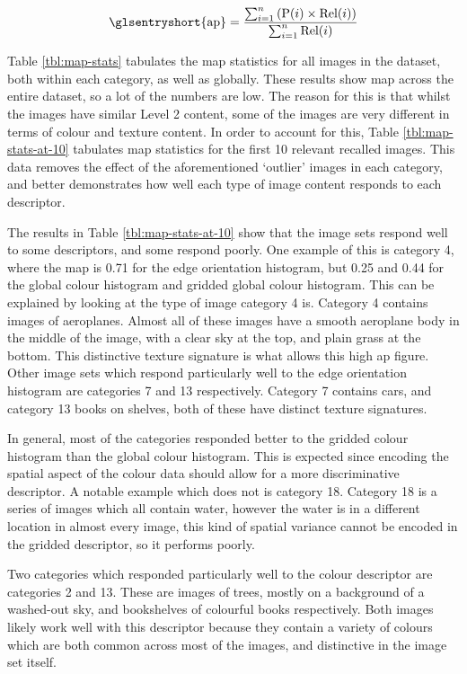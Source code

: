 \begin{equation}
\text{\glsentryshort{ap}} = \frac{\sum_{i=1}^{n} \left( \text{P}(i) \times \text{Rel}(i) \right) }{\sum_{i=1}^{n}  \text{Rel}(i) } \label{eq:map}
\end{equation}

Table \ref{tbl:map-stats} tabulates the \gls{map} statistics for all images in the dataset, both within each category, as well as globally. These results show \gls{map} across the entire dataset, so a lot of the numbers are low. The reason for this is that whilst the images have similar Level 2 content, some of the images are very different in terms of colour and texture content. In order to account for this, Table \ref{tbl:map-stats-at-10} tabulates \gls{map} statistics for the first 10 relevant recalled images. This data removes the effect of the aforementioned `outlier' images in each category, and better demonstrates how well each type of image content responds to each descriptor.

The results in Table \ref{tbl:map-stats-at-10} show that the image sets respond well to some descriptors, and some respond poorly. One example of this is category 4, where the \gls{map} is 0.71 for the edge orientation histogram, but 0.25 and 0.44 for the global colour histogram and gridded global colour histogram. This can be explained by looking at the type of image category 4 is. Category 4 contains images of aeroplanes. Almost all of these images have a smooth aeroplane body in the middle of the image, with a clear sky at the top, and plain grass at the bottom. This distinctive texture signature is what allows this high \gls{ap} figure. Other image sets which respond particularly well to the edge orientation histogram are categories 7 and 13 respectively. Category 7 contains cars, and category 13 books on shelves, both of these have distinct texture signatures.

In general, most of the categories responded better to the gridded colour histogram than the global colour histogram. This is expected since encoding the spatial aspect of the colour data should allow for a more discriminative descriptor. A notable example which does not is category 18. Category 18 is a series of images which all contain water, however the water is in a different location in almost every image, this kind of spatial variance cannot be encoded in the gridded descriptor, so it performs poorly.

Two categories which responded particularly well to the colour descriptor are categories 2 and 13. These are images of trees, mostly on a background of a washed-out sky, and bookshelves of colourful books respectively. Both images likely work well with this descriptor because they contain a variety of colours which are both common across most of the images, and distinctive in the image set itself. 


